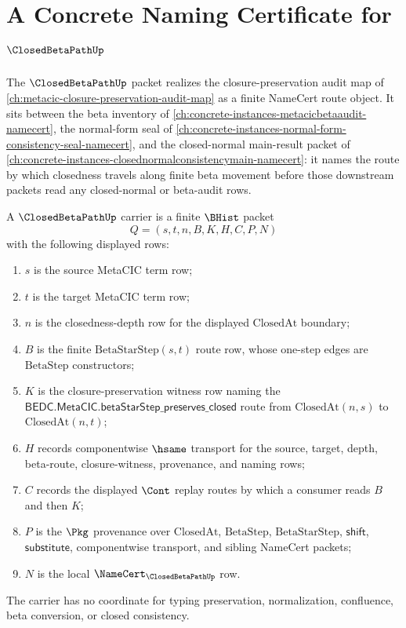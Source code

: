 \chapter{A Concrete Naming Certificate for $\ClosedBetaPathUp$}
\label{ch:concrete-instances-closedbetapath-namecert}

The $\ClosedBetaPathUp$ packet realizes the closure-preservation audit map of
\autoref{ch:metacic-closure-preservation-audit-map} as a finite NameCert route
object. It sits between the beta inventory of
\autoref{ch:concrete-instances-metacicbetaaudit-namecert}, the normal-form
seal of \autoref{ch:concrete-instances-normal-form-consistency-seal-namecert},
and the closed-normal main-result packet of
\autoref{ch:concrete-instances-closednormalconsistencymain-namecert}: it names
the route by which closedness travels along finite beta movement before those
downstream packets read any closed-normal or beta-audit rows.

\begin{definition}
\label{def:closed-beta-path-carrier}
A $\ClosedBetaPathUp$ carrier is a finite $\BHist$ packet
$$
Q=(s,t,n,B,K,H,C,P,N)
$$
with the following displayed rows:
\begin{enumerate}
\item $s$ is the source MetaCIC term row;
\item $t$ is the target MetaCIC term row;
\item $n$ is the closedness-depth row for the displayed $\mathrm{ClosedAt}$
boundary;
\item $B$ is the finite $\mathrm{BetaStarStep}(s,t)$ route row, whose
one-step edges are $\mathrm{BetaStep}$ constructors;
\item $K$ is the closure-preservation witness row naming the
$\mathsf{BEDC.MetaCIC.betaStarStep\_preserves\_closed}$ route from
$\mathrm{ClosedAt}(n,s)$ to $\mathrm{ClosedAt}(n,t)$;
\item $H$ records componentwise $\hsame$ transport for the source, target,
depth, beta-route, closure-witness, provenance, and naming rows;
\item $C$ records the displayed $\Cont$ replay routes by which a consumer reads
$B$ and then $K$;
\item $P$ is the $\Pkg$ provenance over $\mathrm{ClosedAt}$,
$\mathrm{BetaStep}$, $\mathrm{BetaStarStep}$, $\mathsf{shift}$,
$\mathsf{substitute}$, componentwise transport, and sibling NameCert packets;
\item $N$ is the local $\NameCert_{\ClosedBetaPathUp}$ row.
\end{enumerate}
The carrier has no coordinate for typing preservation, normalization,
confluence, beta conversion, or closed consistency.
\end{definition}

